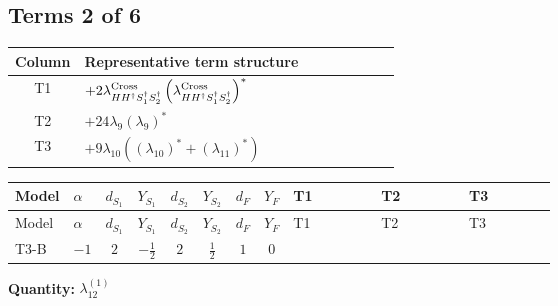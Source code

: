 \documentclass[8pt]{article}
\begin{document}
\begin{landscape}
\subsection*{Terms 2 of 6}
\begin{center}
\begin{tabular}{@{}c >{\raggedright\arraybackslash}p{0.82\linewidth}@{}}
\toprule
Column & Representative term structure \\
\midrule
T1 & \(\displaystyle +2 {\lambda_{H H^\dagger S_1^\dagger S_2^\dagger}^{\rm Cross}} \left({\lambda_{H H^\dagger S_1^\dagger S_2^\dagger}^{\rm Cross}}\right)^{*}\) \\
\midrule
T2 & \(\displaystyle +24 {\lambda_{9}} \left({\lambda_{9}}\right)^{*}\) \\
\midrule
T3 & \(\displaystyle +9 {\lambda_{10}} (\left({\lambda_{10}}\right)^{*}+\left({\lambda_{11}}\right)^{*})\) \\
\midrule
\bottomrule
\end{tabular}
\end{center}
\smallskip
\tiny
\begin{longtable}{@{}llcccccc >{\raggedright\arraybackslash}p{0.21\linewidth} >{\raggedright\arraybackslash}p{0.21\linewidth} >{\raggedright\arraybackslash}p{0.21\linewidth}@{}}
\toprule
Model & $\alpha$ & $d_{S_1}$ & $Y_{S_1}$ & $d_{S_2}$ & $Y_{S_2}$ & $d_F$ & $Y_F$ & T1 & T2 & T3 \\
\midrule
\endfirsthead
\toprule
Model & $\alpha$ & $d_{S_1}$ & $Y_{S_1}$ & $d_{S_2}$ & $Y_{S_2}$ & $d_F$ & $Y_F$ & T1 & T2 & T3 \\
\midrule
\endhead
T3-B & $-1$ & $2$ & $-\frac{1}{2}$ & $2$ & $\frac{1}{2}$ & $1$ & $0$ & \scriptsize\adjustbox{max width=\linewidth}{$\begin{gathered} +2 {\lambda_{H H^\dagger S_1^\dagger S_2^\dagger}^{\rm Cross}} \left({\lambda_{H H^\dagger S_1^\dagger S_2^\dagger}^{\rm Cross}}\right)^{*}\end{gathered}$} & \scriptsize\adjustbox{max width=\linewidth}{$\begin{gathered} +24 {\lambda_{9}} \left({\lambda_{9}}\right)^{*}\end{gathered}$} & \scriptsize\adjustbox{max width=\linewidth}{$\begin{gathered} +9 {\lambda_{10}} (\left({\lambda_{10}}\right)^{*}+\left({\lambda_{11}}\right)^{*}) \\ +9 {\lambda_{11}} (\left({\lambda_{10}}\right)^{*}+\left({\lambda_{11}}\right)^{*})\end{gathered}$} \\
\midrule
\bottomrule
\end{longtable}
\clearpage
\noindent\textbf{Quantity: }$\lambda_{12}^{(1)}$\par\smallskip

\end{landscape}
\end{document}
